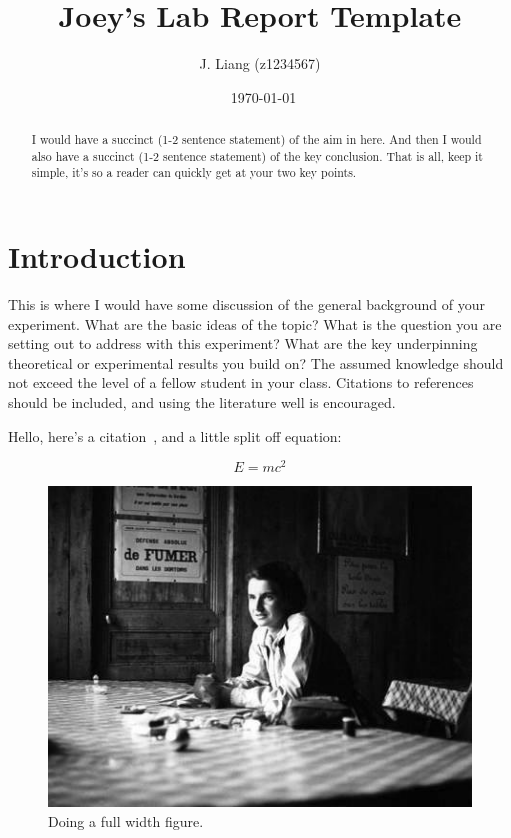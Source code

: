 \documentclass[aps,prl,reprint,10pt,amsmath,amssymb,superscriptaddress,a4paper]{revtex4-2}
\begin{document}
\title{Joey's Lab Report Template}
\author{J. Liang (z1234567)}

\date{\currenttime~\today}

\begin{abstract}
I would have a succinct (1-2 sentence statement) of the aim in here. And then I would also have a succinct (1-2 sentence statement) of the key conclusion. That is all, keep it simple, it's so a reader can quickly get at your two key points.
\end{abstract}

\maketitle

\section{Introduction}
This is where I would have some discussion of the general background of your experiment. What are the basic ideas of the topic? What is the question you are setting out to address with this experiment? What are the key underpinning theoretical or experimental results you build on? The assumed knowledge should not exceed the level of a fellow student in your class. Citations to references should be included, and using the literature well is encouraged.

\lipsum[1] %
Hello, here's a citation~\citep{Smith:2013jd}, and a little split off equation:

\begin{equation}
\label{eqn1}
E = mc^2
\end{equation}

\begin{figure}
\includegraphics[width = 16 cm]{physicist}
\caption{Doing a full width figure.}
\end{figure}
\end{document}
